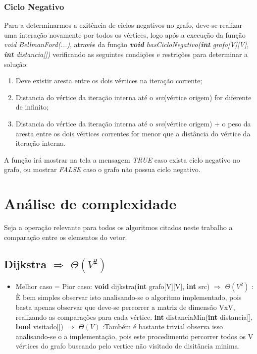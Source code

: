 \documentclass[12pt]{article}
\begin{document}
\subsubsection{Ciclo Negativo}
Para a determinarmos a exitência de ciclos negativos no grafo, deve-se realizar uma interação  novamente por todos os vértices, logo após a execução da função \textit{void BellmanFord(...)}, através da função \textit{\textbf{void} hasCicloNegativo(\textbf{int} grafo[V][V], \textbf{int} distancia[])} verificando as seguintes condições e restrições para determinar a solução:

\begin{enumerate}
\item Deve existir aresta entre os dois vértices na iteração corrente;
\item Distancia do vértice da iteração interna até o \textit{src}(vértice origem) for diferente de infinito;
\item Distancia do vértice da iteração interna até o \textit{src}(vértice origem) + o peso da aresta entre os dois vértices correntes for menor que a distância do vértice da iteração interna.
\end{enumerate}

A função irá mostrar na tela a mensagem  \textit{TRUE} caso exista ciclo negativo no grafo, ou mostrar \textit{FALSE} caso o grafo não possua ciclo negativo.




\section{Análise de complexidade }
Seja a operação relevante para todos os algoritmos citados neste trabalho a comparação entre os elementos do vetor.
\subsection{Dijkstra  \(\Rightarrow\) \(\Theta(V^{2})\)}
\begin{itemize}
\item Melhor caso = Pior caso:
\subitem \textbf{void} dijkstra(\textbf{int} grafo[V][V], \textbf{int} src) \(\Rightarrow\) \(\Theta(V^{2})\) : È bem simples observar isto analisando-se o algoritmo implementado, pois basta apenas observar que deve-se percorrer a matriz de dimensão VxV, realizando as comparações para cada vértice.
\subitem  \textbf{int} distanciaMin(\textbf{int} distancia[], \textbf{bool} visitado[]) \(\Rightarrow\) \(\Theta(V)\) :Também é bastante trivial observa isso analisando-se o a implementação, pois este procedimento percorrer todos os V vértices do grafo buscando pelo vertice não visitado de disitância minima.
\\
\end{itemize}
\end{document}
